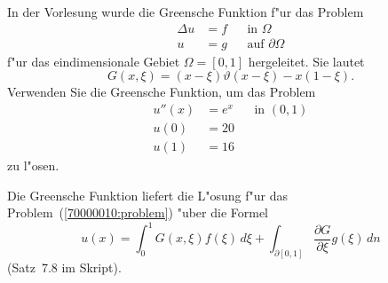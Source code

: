 In der Vorlesung wurde die Greensche Funktion f"ur das Problem
\[
\begin{aligned}
\Delta u&= f & &\text{in $\Omega$}\\
       u&= g & &\text{auf $\partial\Omega$}
\end{aligned}
\]
f"ur das eindimensionale Gebiet  $\Omega=[0,1]$ hergeleitet.
Sie lautet 
\[
G(x,\xi) = (x-\xi)\vartheta(x-\xi) -x(1-\xi).
\]
Verwenden Sie die Greensche Funktion, um das Problem
\[
\begin{aligned}
u''(x)& = e^x& &\text{in $(0,1)$}\\
  u(0)& =  20& &\\
  u(1)& =  16& &
\end{aligned}
\label{70000010:problem}
\]
zu l"osen.

\begin{loesung}
Die Greensche Funktion liefert die L"osung f"ur das
Problem~(\ref{70000010:problem}) "uber die Formel
\begin{equation}
u(x)
=
\int_0^1 G(x,\xi) f(\xi)\,d\xi
+
\int_{\partial[0,1]}\frac{\partial G}{\partial \xi} g(\xi)\,dn
\label{70000010:green}
\end{equation}
(Satz~7.8 im Skript). 


\end{loesung}
